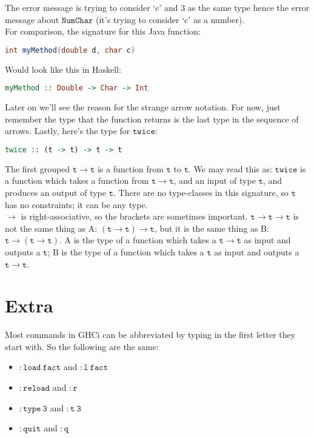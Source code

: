 \documentclass[a4paper,12pt]{article}
\newcommand{\keywadj}[1]{\mathtt{#1}}
\begin{document}
\noindent
The error message is trying to consider `c' and 3 as the same type hence the error message about $\keywadj{Num Char}$ (it's trying to consider `c' as a number). \\

\noindent
For comparison, the signature for this Java function:

\begin{lstlisting}[language=Java]
int myMethod(double d, char c)
\end{lstlisting}

\noindent
Would look like this in Haskell:

\begin{lstlisting}[language=Haskell]
myMethod :: Double -> Char -> Int
\end{lstlisting}

\noindent
Later on we'll see the reason for the strange arrow notation. For now, just remember the type that the function returns is the last type in the sequence of arrows. Lastly, here's the type for $\keywadj{twice}$:

\begin{lstlisting}[language=Haskell]
twice :: (t -> t) -> t -> t
\end{lstlisting}

\noindent
The first grouped $\keywadj{t \rightarrow t}$ is a function from $\keywadj{t}$ to $\keywadj{t}$. We may read this as: $\keywadj{twice}$ is a function which takes a function from $\keywadj{t \rightarrow t}$, and an input of type $\keywadj{t}$, and produces an output of type $\keywadj{t}$. There are no type-classes in this signature, so $\keywadj{t}$ has no constraints; it can be any type. \\

\noindent
$\rightarrow$ is right-associative, so the brackets are sometimes important. $\keywadj{t \rightarrow t \rightarrow t}$ is not the same thing as A: $\keywadj{(t \rightarrow t) \rightarrow t}$, but it is the same thing as B: $\keywadj{t \rightarrow (t \rightarrow t)}$. A is the type of a function which takes a $\keywadj{t \rightarrow t}$ as input and outputs a $\keywadj{t}$; B is the type of a function which takes a $\keywadj{t}$ as input and outputs a $\keywadj{t \rightarrow t}$.

\section{Extra}

Most commands in GHCi can be abbreviated by typing in the first letter they start with. So the following are the same:
\begin{itemize}
	\item $\keywadj{:load~fact}$ and $\keywadj{:l~fact}$
	\item $\keywadj{:reload}$ and $\keywadj{:r}$
	\item $\keywadj{:type~3}$ and $\keywadj{:t~3}$
	\item $\keywadj{:quit}$ and $\keywadj{:q}$
\end{itemize}
\end{document}
